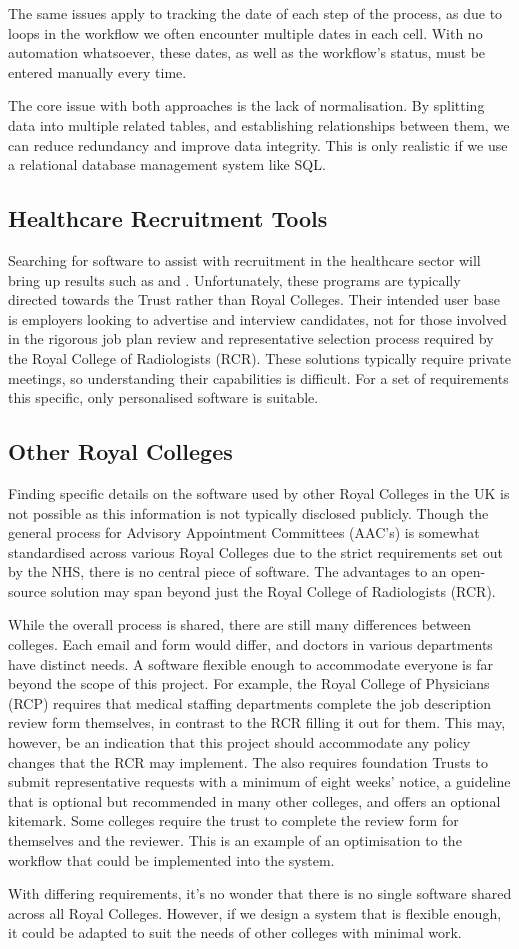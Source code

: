 The same issues apply to tracking the date of each step of the process, as due to loops in the workflow we often encounter multiple dates in each cell. With no automation whatsoever, these dates, as well as the workflow’s status, must be entered manually every time.

The core issue with both approaches is the lack of normalisation. By splitting data into multiple related tables, and establishing relationships between them, we can reduce redundancy and improve data integrity. This is only realistic if we use a relational database management system like SQL.

\subsection{Healthcare Recruitment Tools}
Searching for software to assist with recruitment in the healthcare sector will bring up results such as \textcite{icims_icims_nodate} and \textcite{the_access_group_access_nodate}. Unfortunately, these programs are typically directed towards the Trust rather than Royal Colleges. Their intended user base is employers looking to advertise and interview candidates, not for those involved in the rigorous job plan review and representative selection process required by the Royal College of Radiologists (RCR). These solutions typically require private meetings, so understanding their capabilities is difficult. For a set of requirements this specific, only personalised software is suitable.

\subsection{Other Royal Colleges}
Finding specific details on the software used by other Royal Colleges in the UK is not possible as this information is not typically disclosed publicly. Though the general process for Advisory Appointment Committees (AAC’s) is somewhat standardised across various Royal Colleges due to the strict requirements set out by the NHS, there is no central piece of software. The advantages to an open-source solution may span beyond just the Royal College of Radiologists (RCR). 

While the overall process is shared, there are still many differences between colleges. Each email and form would differ, and doctors in various departments have distinct needs. A software flexible enough to accommodate everyone is far beyond the scope of this project. For example, the Royal College of Physicians (RCP) requires that medical staffing departments complete the job description review form themselves, in contrast to the RCR filling it out for them. This may, however, be an indication that this project should accommodate any policy changes that the RCR may implement. The \textcite{royal_college_of_physicians_of_london_rcp_2017} also requires foundation Trusts to submit representative requests with a minimum of eight weeks’ notice, a guideline that is optional but recommended in many other colleges, and offers an optional kitemark. Some colleges require the trust to complete the review form for themselves and the reviewer. This is an example of an optimisation to the workflow that could be implemented into the system.

With differing requirements, it’s no wonder that there is no single software shared across all Royal Colleges. However, if we design a system that is flexible enough, it could be adapted to suit the needs of other colleges with minimal work.
